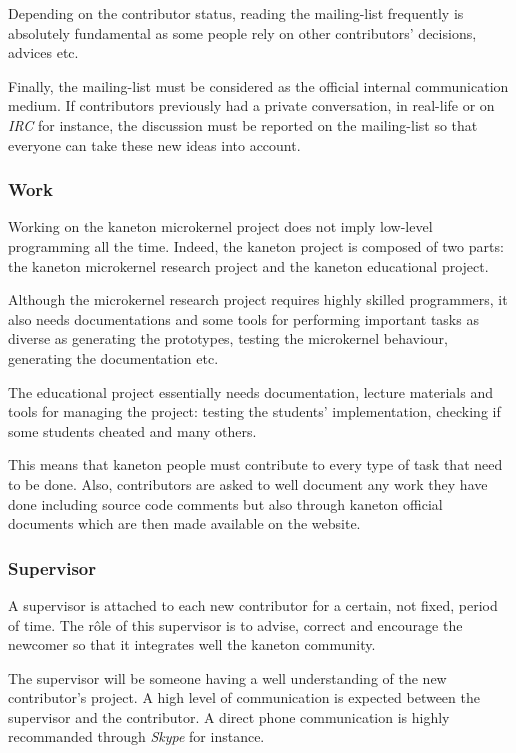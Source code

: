 Depending on the contributor status, reading the mailing-list frequently is
absolutely fundamental as some people rely on other contributors' decisions,
advices etc.

Finally, the mailing-list must be considered as the official internal
communication medium. If contributors previously had a private conversation,
in real-life or on \textit{IRC} for instance, the discussion must be reported
on the mailing-list so that everyone can take these new ideas into account.


\subsubsection{Work}

Working on the kaneton microkernel project does not imply low-level programming
all the time. Indeed, the kaneton project is composed of two parts: the
kaneton microkernel research project and the kaneton educational project.

Although the microkernel research project requires highly skilled programmers,
it also needs documentations and some tools for performing important tasks as
diverse as generating the prototypes, testing the microkernel behaviour,
generating the documentation etc.

The educational project essentially needs documentation, lecture materials
and tools for managing the project: testing the students' implementation,
checking if some students cheated and many others.

This means that kaneton people must contribute to every type of task
that need to be done. Also, contributors are asked to well document
any work they have done including source code comments but also through
kaneton official documents which are then made available on the website.


\subsubsection{Supervisor}

A supervisor is attached to each new contributor for a certain, not fixed,
period of time. The r\^ole of this supervisor is to advise, correct and
encourage the newcomer so that it integrates well the kaneton community.

The supervisor will be someone having a well understanding of the new
contributor's project. A high level of communication is expected between
the supervisor and the contributor. A direct phone communication is highly
recommanded through \textit{Skype} for instance.

